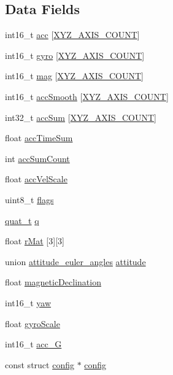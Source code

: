 \subsection*{Data Fields}
\begin{DoxyCompactItemize}
\item 
int16\+\_\+t \hyperlink{structimu_a43f0ccec5140b596150315621bf6a20b}{acc} \mbox{[}\hyperlink{axis_8h_a93ac071aee723ba4580dfc8b72ae847f}{X\+Y\+Z\+\_\+\+A\+X\+I\+S\+\_\+\+C\+O\+U\+N\+T}\mbox{]}
\item 
int16\+\_\+t \hyperlink{structimu_ac019d6da4c291b43dd8084e0f06db086}{gyro} \mbox{[}\hyperlink{axis_8h_a93ac071aee723ba4580dfc8b72ae847f}{X\+Y\+Z\+\_\+\+A\+X\+I\+S\+\_\+\+C\+O\+U\+N\+T}\mbox{]}
\item 
int16\+\_\+t \hyperlink{structimu_a8c183c7e7dc50b83141db4c75089a3c2}{mag} \mbox{[}\hyperlink{axis_8h_a93ac071aee723ba4580dfc8b72ae847f}{X\+Y\+Z\+\_\+\+A\+X\+I\+S\+\_\+\+C\+O\+U\+N\+T}\mbox{]}
\item 
int16\+\_\+t \hyperlink{structimu_a92c9d735afcc7d08049adaee8cebc4e1}{acc\+Smooth} \mbox{[}\hyperlink{axis_8h_a93ac071aee723ba4580dfc8b72ae847f}{X\+Y\+Z\+\_\+\+A\+X\+I\+S\+\_\+\+C\+O\+U\+N\+T}\mbox{]}
\item 
int32\+\_\+t \hyperlink{structimu_adefe15545fa149bf5a3a5e3163fcd645}{acc\+Sum} \mbox{[}\hyperlink{axis_8h_a93ac071aee723ba4580dfc8b72ae847f}{X\+Y\+Z\+\_\+\+A\+X\+I\+S\+\_\+\+C\+O\+U\+N\+T}\mbox{]}
\item 
float \hyperlink{structimu_a6f6a85c2739a8a912f5fd8988a0a584d}{acc\+Time\+Sum}
\item 
int \hyperlink{structimu_a51ba67db8678eec1b0cb38196f53a561}{acc\+Sum\+Count}
\item 
float \hyperlink{structimu_a6f515bf6ae1ada05c4a5a1ac646d5d37}{acc\+Vel\+Scale}
\item 
uint8\+\_\+t \hyperlink{structimu_a56ba1722e4c7532cf8abdb8609409ed9}{flags}
\item 
\hyperlink{quaternion_8h_afa59c16bbf0d057ddc01eb80bdd7c339}{quat\+\_\+t} \hyperlink{structimu_aff0979d5140e3b0cb4531e7e1901728f}{q}
\item 
float \hyperlink{structimu_a6d69701dfc71932e6309366f9addadda}{r\+Mat} \mbox{[}3\mbox{]}\mbox{[}3\mbox{]}
\item 
union \hyperlink{unionattitude__euler__angles}{attitude\+\_\+euler\+\_\+angles} \hyperlink{structimu_a1be9fe63a9d487faab37addb481aae63}{attitude}
\item 
float \hyperlink{structimu_a472b36b356e3efaacac429582cdce080}{magnetic\+Declination}
\item 
int16\+\_\+t \hyperlink{structimu_ad88aa77e4111f3d9ac702e81cd1d02dd}{yaw}
\item 
float \hyperlink{structimu_a45a70878798abc053965cd42e847ed5f}{gyro\+Scale}
\item 
int16\+\_\+t \hyperlink{structimu_aadf5a464c71935c0d35904bf8151f1f3}{acc\+\_\+G}
\item 
const struct \hyperlink{structconfig}{config} $\ast$ \hyperlink{structimu_a284b22d9660acd784758eb89c406a1db}{config}
\end{DoxyCompactItemize}


